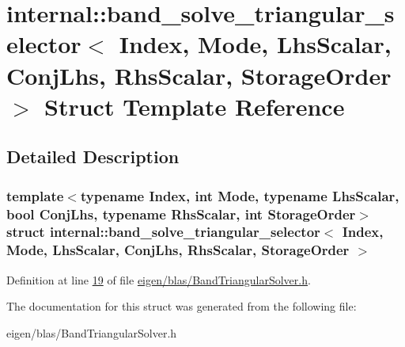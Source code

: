 \hypertarget{structinternal_1_1band__solve__triangular__selector}{}\section{internal\+:\+:band\+\_\+solve\+\_\+triangular\+\_\+selector$<$ Index, Mode, Lhs\+Scalar, Conj\+Lhs, Rhs\+Scalar, Storage\+Order $>$ Struct Template Reference}
\label{structinternal_1_1band__solve__triangular__selector}


\subsection{Detailed Description}
\subsubsection*{template$<$typename Index, int Mode, typename Lhs\+Scalar, bool Conj\+Lhs, typename Rhs\+Scalar, int Storage\+Order$>$\newline
struct internal\+::band\+\_\+solve\+\_\+triangular\+\_\+selector$<$ Index, Mode, Lhs\+Scalar, Conj\+Lhs, Rhs\+Scalar, Storage\+Order $>$}



Definition at line \hyperlink{eigen_2blas_2_band_triangular_solver_8h_source_l00019}{19} of file \hyperlink{eigen_2blas_2_band_triangular_solver_8h_source}{eigen/blas/\+Band\+Triangular\+Solver.\+h}.



The documentation for this struct was generated from the following file\+:\begin{DoxyCompactItemize}
\item 
eigen/blas/\+Band\+Triangular\+Solver.\+h\end{DoxyCompactItemize}
